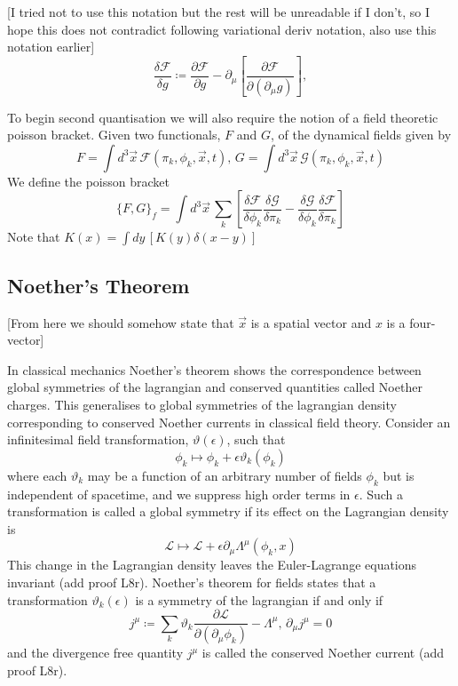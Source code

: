 \documentclass[11pt, a4paper]{article}
\theoremstyle{definition}
\theoremstyle{plain}
\begin{document}
[I tried not to use this notation but the rest will be unreadable if I don't, so I hope this
does not contradict following variational deriv notation, also use this notation earlier]
\begin{equation}
  \frac{\delta \mathcal{F}}{\delta g} \coloneq \frac{\partial \mathcal{F}}{\partial g}
  - \partial_\mu \left[ \frac{\partial \mathcal{F}}{\partial (\partial_\mu g)} \right],
\end{equation}

To begin second quantisation we will also require the notion of a field theoretic poisson bracket.
Given two functionals, $F$ and $G$, of the dynamical fields given by 
\begin{equation}
  F = \int{d^3\vec{x}\, \mathcal{F}(\pi_k, \phi_k, \vec{x}, t)},\,
  G = \int{d^3\vec{x}\, \mathcal{G}(\pi_k, \phi_k, \vec{x}, t)}
\end{equation}
We define the poisson bracket
\begin{equation}
  {\{F, G \}}_{f} = \int{d^3\vec{x}\,
  \sum_{k}{\left[ \frac{\delta \mathcal{F}}{\delta \phi_k}\frac{\delta \mathcal{G}}{\delta \pi_k} 
- \frac{\delta \mathcal{G}}{\delta \phi_k}\frac{\delta \mathcal{F}}{\delta \pi_k} \right]}  }
\end{equation}
Note that $K({x}) = \int{d{y}\,[K({y}) \delta(x - y)]}$


\subsection{Noether's Theorem}
[From here we should somehow state that $\vec{x}$ is a spatial vector and $x$ is a four-vector]

In classical mechanics Noether's theorem shows the correspondence between global symmetries of 
the lagrangian and conserved quantities called Noether charges. This generalises to global symmetries
of the lagrangian density corresponding to conserved Noether currents in classical field theory.
Consider an infinitesimal field transformation, $\vartheta(\epsilon)$, such that
\begin{equation}
  \phi_k \mapsto \phi_k + \epsilon\vartheta_k(\phi_k)
\end{equation}
where each $\vartheta_k$ may be a function of an arbitrary number of fields $\phi_k$ but
is independent of spacetime, and we suppress high order terms in $\epsilon$.
Such a transformation is called a global symmetry if its effect on the Lagrangian density is
\begin{equation}
  \mathcal{L} \mapsto \mathcal{L} + \epsilon\partial_\mu\Lambda^\mu(\phi_k, x)
\end{equation}
This change in the Lagrangian density leaves the Euler-Lagrange equations invariant (add proof L8r).
Noether's theorem for fields states that a transformation $\vartheta_k(\epsilon)$ is a symmetry
of the lagrangian if and only if 
\begin{equation}
  j^\mu \coloneq
  \sum_{k}{\vartheta_k \frac{\partial \mathcal{L}}{\partial (\partial_\mu \phi_k)}}
  - \Lambda^\mu, \, \partial_\mu j^\mu = 0 
\end{equation}
and the divergence free quantity $j^\mu$ is called the conserved Noether current (add proof L8r).
\end{document}
